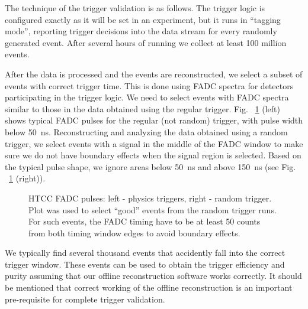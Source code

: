 The technique of the trigger validation is as follows. The trigger logic is configured exactly as it will be set in an experiment, but it runs in ``tagging mode'', reporting trigger decisions into the data stream for every randomly generated event. After several hours of running we collect at least 100 million events.

After the data is processed and the events are reconstructed, we select a subset of events with correct trigger time. This is done using FADC spectra for detectors participating in the trigger logic. We need to select events with FADC spectra similar to those in the data obtained using the regular trigger. Fig. ~\ref{fig:htcc_fadc} (left) shows typical FADC pulses for the regular (not random) trigger, with pulse width below 50~ns. Reconstructing and analyzing the data obtained using a random trigger, we select events with a signal in the middle of the FADC window to make sure we do not have boundary effects when the signal region is selected. Based on the typical pulse shape, we ignore areas below 50~ns and above 150~ns (see Fig. ~\ref{fig:htcc_fadc} (right)).

\begin{figure}[!htb]
	\centering
	\caption{HTCC FADC pulses: left - physics triggers, right - random trigger. Plot was used to select ``good'' events from the random trigger runs. For such events, the FADC timing have to be at least 50 counts from both timing window edges to avoid boundary effects.}
	\label{fig:htcc_fadc}
\end{figure}

We typically find several thousand events that accidently fall into the correct trigger window. These events can be used to obtain the trigger efficiency and purity assuming that our offline reconstruction software works correctly. It should be mentioned that correct working of the offline reconstruction is an important pre-requisite for complete trigger validation.


